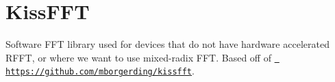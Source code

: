 \chapter{Kiss\+FFT}
\hypertarget{md__face___access__inferencing_2src_2edge-impulse-sdk_2dsp_2kissfft_2_r_e_a_d_m_e}{}\label{md__face___access__inferencing_2src_2edge-impulse-sdk_2dsp_2kissfft_2_r_e_a_d_m_e}
\label{md__face___access__inferencing_2src_2edge-impulse-sdk_2dsp_2kissfft_2_r_e_a_d_m_e_autotoc_md388}%
%


Software FFT library used for devices that do not have hardware accelerated RFFT, or where we want to use mixed-\/radix FFT. Based off of \href{https://github.com/mborgerding/kissfft}{\texttt{ https\+://github.\+com/mborgerding/kissfft}}. 